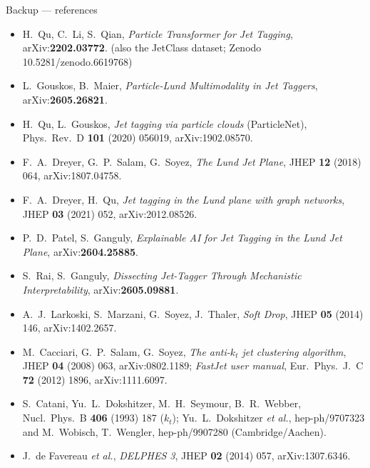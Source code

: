 \documentclass[aspectratio=169,10pt]{beamer}
\newcommand{\smallnote}[1]{{\footnotesize\color{fjgray} #1}}
\begin{document}
\begin{frame}{Backup --- references}
\footnotesize
\begin{itemize}\setlength{\itemsep}{2pt}
  \item H.~Qu, C.~Li, S.~Qian, \emph{Particle Transformer for Jet Tagging},
        arXiv:\textbf{2202.03772}. \smallnote{(also the JetClass dataset;
        Zenodo 10.5281/zenodo.6619768)}
  \item L.~Gouskos, B.~Maier, \emph{Particle-Lund Multimodality in Jet Taggers},
        arXiv:\textbf{2605.26821}.
  \item H.~Qu, L.~Gouskos, \emph{Jet tagging via particle clouds}
        \smallnote{(ParticleNet)}, Phys.~Rev.~D \textbf{101} (2020) 056019,
        arXiv:1902.08570.
  \item F.~A.~Dreyer, G.~P.~Salam, G.~Soyez, \emph{The Lund Jet Plane},
        JHEP \textbf{12} (2018) 064, arXiv:1807.04758.
  \item F.~A.~Dreyer, H.~Qu, \emph{Jet tagging in the Lund plane with graph
        networks}, JHEP \textbf{03} (2021) 052, arXiv:2012.08526.
  \item P.~D.~Patel, S.~Ganguly, \emph{Explainable AI for Jet Tagging in the
        Lund Jet Plane}, arXiv:\textbf{2604.25885}.
  \item S.~Rai, S.~Ganguly, \emph{Dissecting Jet-Tagger Through Mechanistic
        Interpretability}, arXiv:\textbf{2605.09881}.
  \item A.~J.~Larkoski, S.~Marzani, G.~Soyez, J.~Thaler, \emph{Soft Drop},
        JHEP \textbf{05} (2014) 146, arXiv:1402.2657.
  \item M.~Cacciari, G.~P.~Salam, G.~Soyez, \emph{The anti-$k_t$ jet clustering
        algorithm}, JHEP \textbf{04} (2008) 063, arXiv:0802.1189; \emph{FastJet
        user manual}, Eur.~Phys.~J.~C \textbf{72} (2012) 1896, arXiv:1111.6097.
  \item S.~Catani, Yu.~L.~Dokshitzer, M.~H.~Seymour, B.~R.~Webber,
        Nucl.~Phys.~B \textbf{406} (1993) 187 \smallnote{($k_t$)};
        Yu.~L.~Dokshitzer \emph{et al.}, hep-ph/9707323 and M.~Wobisch,
        T.~Wengler, hep-ph/9907280 \smallnote{(Cambridge/Aachen)}.
  \item J.~de Favereau \emph{et al.}, \emph{DELPHES 3}, JHEP \textbf{02} (2014)
        057, arXiv:1307.6346.
\end{itemize}
\end{frame}
\end{document}
